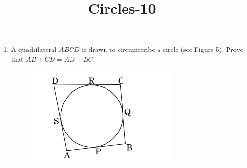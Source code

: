 \documentclass{article}
\begin{document}
\title{Circles-10}
\begin{enumerate}
	\item A quadrilateral $ABCD$ is drawn to circumscribe a circle (see Figure 5). Prove that $AB + CD = AD + BC$.
		\begin{figure}[!htb]
		\centering
		\includegraphics{fig.png}
		

\end{figure}
\end{enumerate}
\end{document}

